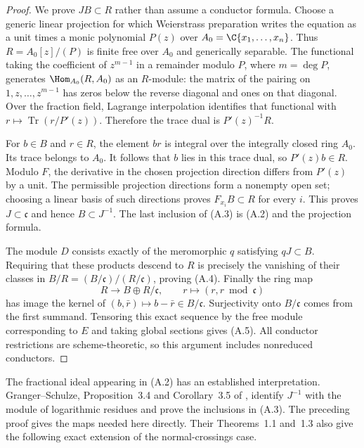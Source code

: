 \begin{proof}
We prove $JB\subset R$ rather than assume a conductor formula. Choose a generic linear projection for which Weierstrass preparation writes the equation as a unit times a monic polynomial $P(z)$ over $A_0=\C\{x_1,\ldots,x_n\}$. Thus $R=A_0[z]/(P)$ is finite free over $A_0$ and generically separable. The functional taking the coefficient of $z^{m-1}$ in a remainder modulo $P$, where $m=\deg P$, generates $\Hom_{A_0}(R,A_0)$ as an $R$-module: the matrix of the pairing on $1,z,\ldots,z^{m-1}$ has zeros below the reverse diagonal and ones on that diagonal. Over the fraction field, Lagrange interpolation identifies that functional with $r\mapsto\operatorname{Tr}(r/P'(z))$. Therefore the trace dual is $P'(z)^{-1}R$.

For $b\in B$ and $r\in R$, the element $br$ is integral over the integrally closed ring $A_0$. Its trace belongs to $A_0$. It follows that $b$ lies in this trace dual, so $P'(z)b\in R$. Modulo $F$, the derivative in the chosen projection direction differs from $P'(z)$ by a unit. The permissible projection directions form a nonempty open set; choosing a linear basis of such directions proves $F_{x_i}B\subset R$ for every $i$. This proves $J\subset\mathfrak c$ and hence $B\subset J^{-1}$. The last inclusion of (A.3) is (A.2) and the projection formula.

The module $D$ consists exactly of the meromorphic $q$ satisfying $qJ\subset B$. Requiring that these products descend to $R$ is precisely the vanishing of their classes in $B/R=(B/\mathfrak c)/(R/\mathfrak c)$, proving (A.4). Finally the ring map
\[
 R\longrightarrow B\oplus R/\mathfrak c,
 \qquad r\longmapsto(r,r\bmod\mathfrak c)
\]
has image the kernel of $(b,\bar r)\mapsto b-\bar r\in B/\mathfrak c$. Surjectivity onto $B/\mathfrak c$ comes from the first summand. Tensoring this exact sequence by the free module corresponding to $E$ and taking global sections gives (A.5). All conductor restrictions are scheme-theoretic, so this argument includes nonreduced conductors.
\end{proof}

The fractional ideal appearing in (A.2) has an established interpretation. Granger--Schulze, Proposition~3.4 and Corollary~3.5 of \cite{GS2014}, identify $J^{-1}$ with the module of logarithmic residues and prove the inclusions in (A.3). The preceding proof gives the maps needed here directly. Their Theorems~1.1 and~1.3 also give the following exact extension of the normal-crossings case.

